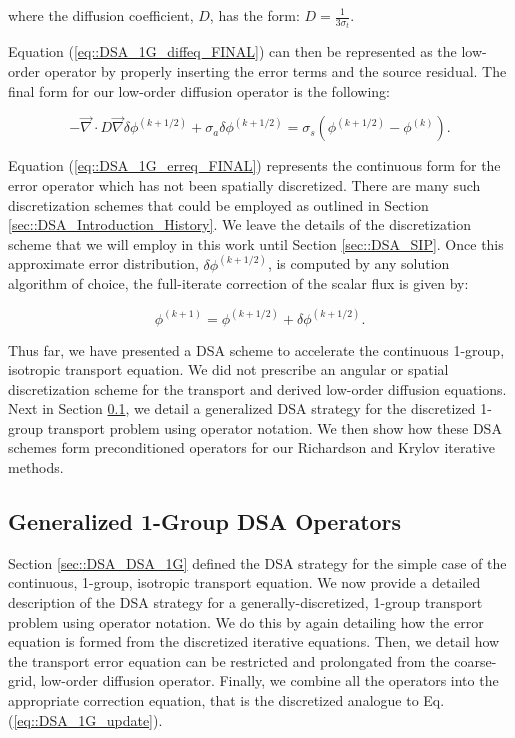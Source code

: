 \noindent where the diffusion coefficient, $D$, has the form: $D = \frac{1}{3 \sigma_t}$. 

Equation (\ref{eq::DSA_1G_diffeq_FINAL}) can then be represented as the low-order operator by properly inserting the error terms and the source residual. The final form for our low-order diffusion operator is the following:

\begin{equation}
\label{eq::DSA_1G_erreq_FINAL}
-\vec{\nabla} \cdot D \vec{\nabla} \delta \phi^{(k+1/2)} + \sigma_a \delta \phi^{(k+1/2)} = \sigma_s \left( \phi^{(k+1/2)} -  \phi^{(k)}\right)  .
\end{equation}

\noindent Equation (\ref{eq::DSA_1G_erreq_FINAL}) represents the continuous form for the error operator which has not been spatially discretized. There are many such discretization schemes that could be employed as outlined in Section \ref{sec::DSA_Introduction_History}. We leave the details of the discretization scheme that we will employ in this work until Section \ref{sec::DSA_SIP}. Once this approximate error distribution, $\delta \phi^{(k+1/2)}$, is computed by any solution algorithm of choice, the full-iterate correction of the scalar flux is given by:

\begin{equation}
\label{eq::DSA_1G_update}
 \phi^{(k+1)} =  \phi^{(k+1/2)} + \delta \phi^{(k+1/2)} .
\end{equation}

\noindent Thus far, we have presented a DSA scheme to accelerate the continuous 1-group, isotropic transport equation. We did not prescribe an angular or spatial discretization scheme for the transport and derived low-order diffusion equations. Next in Section \ref{sec::DSA_DSA_Operator}, we detail a generalized DSA strategy for the discretized 1-group transport problem using operator notation. We then show how these DSA schemes form preconditioned operators for our Richardson and Krylov iterative methods.

\subsection{Generalized 1-Group DSA Operators}
\label{sec::DSA_DSA_Operator}

Section \ref{sec::DSA_DSA_1G} defined the DSA strategy for the simple case of the continuous, 1-group, isotropic transport equation. We now provide a detailed description of the DSA strategy for a generally-discretized, 1-group transport problem using operator notation. We do this by again detailing how the error equation is formed from the discretized iterative equations. Then, we detail how the transport error equation can be restricted and prolongated from the coarse-grid, low-order diffusion operator. Finally, we combine all the operators into the appropriate correction equation, that is the discretized analogue to Eq. (\ref{eq::DSA_1G_update}).

